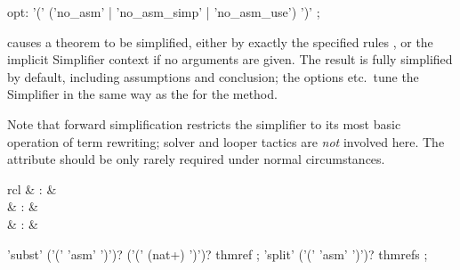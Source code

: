 \begin{isabellebody}
\begin{isamarkuptext}
\begin{rail}
    opt: '(' ('no\_asm' | 'no\_asm\_simp' | 'no\_asm\_use') ')'
    ;
  \end{rail}

  \begin{descr}
  
  \item [\hyperlink{attribute.simplified}{\mbox{\isa{simplified}}}~\isa{{\isachardoublequote}a\isactrlsub {\isadigit{1}}\ {\isasymdots}\ a\isactrlsub n{\isachardoublequote}}]
  causes a theorem to be simplified, either by exactly the specified
  rules , or the implicit Simplifier
  context if no arguments are given.  The result is fully simplified
  by default, including assumptions and conclusion; the options  etc.\ tune the Simplifier in the same way as the for the
   method.

  Note that forward simplification restricts the simplifier to its
  most basic operation of term rewriting; solver and looper tactics
  \cite{isabelle-ref} are \emph{not} involved here.  The  attribute should be only rarely required under normal
  circumstances.

  \end{descr}%
\end{isamarkuptext}%
\isamarkuptrue%
%
\isamarkuptrue%
%
\begin{isamarkuptext}%
\begin{matharray}{rcl}
    \hypertarget{method.subst}{\hyperlink{method.subst}{\mbox{}}}\isa{{\isachardoublequote}\isactrlsup {\isacharasterisk}{\isachardoublequote}} & : & \isarmeth \\
    \hypertarget{method.hypsubst}{\hyperlink{method.hypsubst}{\mbox{}}}\isa{{\isachardoublequote}\isactrlsup {\isacharasterisk}{\isachardoublequote}} & : & \isarmeth \\
    \hypertarget{method.split}{\hyperlink{method.split}{\mbox{}}}\isa{{\isachardoublequote}\isactrlsup {\isacharasterisk}{\isachardoublequote}} & : & \isarmeth \\
  \end{matharray}

  \begin{rail}
    'subst' ('(' 'asm' ')')? ('(' (nat+) ')')? thmref
    ;
    'split' ('(' 'asm' ')')? thmrefs
    ;
  \end{rail}


\end{isamarkuptext}
\end{isabellebody}
